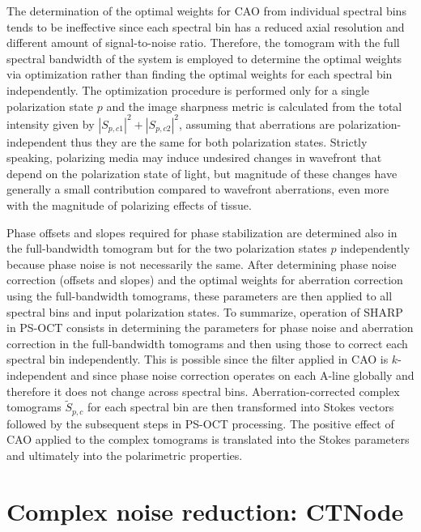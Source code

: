 The determination of the optimal weights for CAO from individual spectral bins tends to be ineffective since each spectral bin has a reduced axial resolution and different amount of signal-to-noise ratio. Therefore, the tomogram with the full spectral bandwidth of the system is employed to determine the optimal weights via optimization rather than finding the optimal weights for each spectral bin independently. The optimization procedure is performed only for a single polarization state $p$ and the image sharpness metric is calculated from the total intensity given by $|S_{p,c1}|^2 + |S_{p,c2}|^2$, assuming that aberrations are polarization-independent thus they are the same for both polarization states. Strictly speaking, polarizing media may induce undesired changes in wavefront that depend on the polarization state of light, but magnitude of these changes have generally a small contribution compared to wavefront aberrations, even more with the magnitude of polarizing effects of tissue.

Phase offsets and slopes required for phase stabilization are determined also in the full-bandwidth tomogram but for the two polarization states $p$ independently because phase noise is not necessarily the same. After determining phase noise correction (offsets and slopes) and the optimal weights for aberration correction using the full-bandwidth tomograms, these parameters are then applied to all spectral bins and input polarization states. To summarize, operation of SHARP in PS-OCT consists in determining the parameters for phase noise and aberration correction in the full-bandwidth tomograms and then using those to correct each spectral bin independently. This is possible since the filter applied in CAO is $k$-independent and since phase noise correction operates on each A-line globally and therefore it does not change across spectral bins. Aberration-corrected complex tomograms  $\tilde{S}_{p,c}$ for each spectral bin are then transformed into Stokes vectors followed by the subsequent steps in PS-OCT processing. The positive effect of CAO applied to the complex tomograms is translated into the Stokes parameters and ultimately into the polarimetric properties.

\section{Complex noise reduction: CTNode}\label{sec:CTNode}

